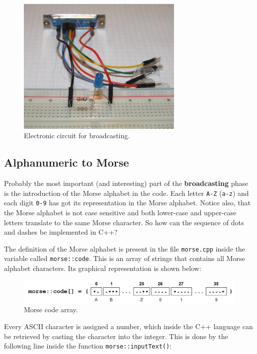 \documentclass[12pt]{report}
\begin{document}
\begin{figure}[H]
\centering\includegraphics[width=8cm]{broadcast_circuit}
\caption{Electronic circuit for broadcasting.}				
\label{fig:broadcast_circuit}
\end{figure}

\subsection{Alphanumeric to Morse} \label{sec:asciitomorse}

Probably the most important (and interesting) part of the \textbf{broadcasting} phase is the introduction of the Morse alphabet in the code. Each letter \verb|A-Z| (\verb|a-z|) and each digit \verb|0-9| has got its representation in the Morse alphabet. Notice also, that the Morse alphabet is not case sensitive and both lower-case and upper-case letters translate to the same Morse character. So how can the sequence of dots and dashes be implemented in C++?

The definition of the Morse alphabet is present in the file \verb|morse.cpp| inside the variable called \verb|morse::code|. This is an array of strings that contains all Morse alphabet characters. Its graphical representation is shown below:

\begin{figure}[H]
\centering\includegraphics[scale=0.1]{morse--code}
\caption{Morse code array.}				
\label{fig:morse_code_array}
\end{figure}

Every ASCII character is assigned a number, which inside the C++ language can be retrieved by casting the character into the integer. This is done by the following line inside the function \verb|morse::inputText()|: 
\end{document}

